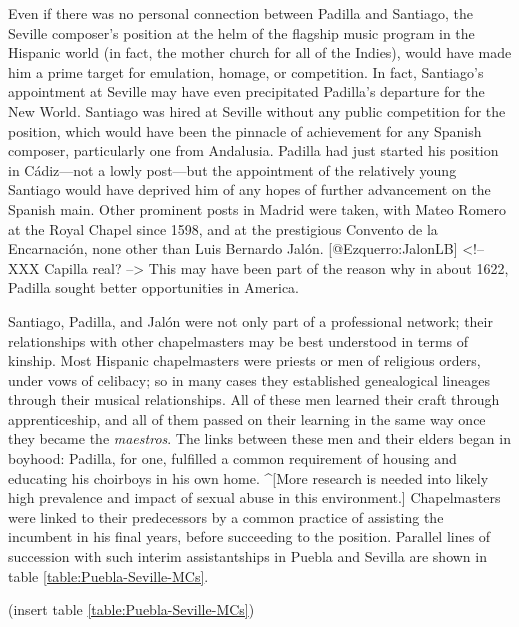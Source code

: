 Even if there was no personal connection between Padilla and Santiago, the
Seville composer's position at the helm of the flagship music program in the
Hispanic world (in fact, the mother church for all of the Indies), would have
made him a prime target for emulation, homage, or competition.
In fact, Santiago's appointment at Seville may have even precipitated Padilla's
departure for the New World.
Santiago was hired at Seville without any public competition for the position,
which would have been the pinnacle of achievement for any Spanish composer,
particularly one from Andalusia.
Padilla had just started his position in Cádiz---not a lowly post---but the
appointment of the relatively young Santiago would have deprived him of any
hopes of further advancement on the Spanish main.
Other prominent posts in Madrid were taken, with Mateo Romero at the Royal Chapel
since 1598, and at the prestigious Convento de la Encarnación, none other than
Luis Bernardo Jalón.
[@Ezquerro:JalonLB] <!-- XXX Capilla real? -->
This may have been part of the reason why in about 1622, Padilla sought better
opportunities in America.

Santiago, Padilla, and Jalón were not only part of a professional network; their
relationships with other chapelmasters may be best understood in terms of
kinship.
Most Hispanic chapelmasters were priests or men of religious orders, under vows
of celibacy; so in many cases they established genealogical lineages through
their musical relationships.
All of these men learned their craft through apprenticeship, and all of them
passed on their learning in the same way once they became the \emph{maestros}.
The links between these men and their elders began in boyhood: Padilla, for one,
fulfilled a common requirement of housing and educating his choirboys in his own
home.
^[More research is needed into likely high prevalence and impact of sexual abuse
in this environment.]
Chapelmasters were linked to their predecessors by a common practice of
assisting the incumbent in his final years, before succeeding to the position.
Parallel lines of succession with such interim assistantships in Puebla and
Sevilla are shown in table \ref{table:Puebla-Seville-MCs}.

(insert table \ref{table:Puebla-Seville-MCs})
\label{table:Puebla-Seville-MCs}

